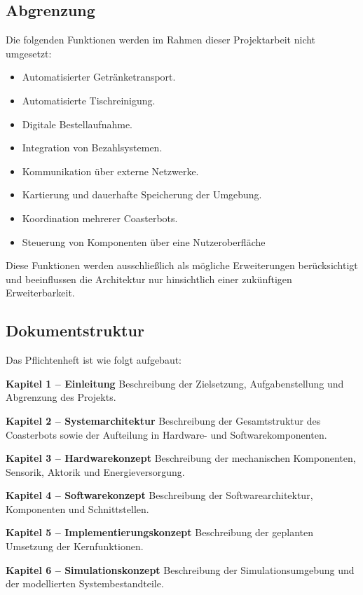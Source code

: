 \documentclass[
  a4paper,
  12pt,
  DIV=12,        %
  parskip=half,  %
  headings=small %
]{scrartcl}
\theoremstyle{definition}
\providecommand{\tightlist}{%
  \setlength{\itemsep}{0pt}\setlength{\parskip}{0pt}}
\theoremstyle{definition}
\begin{document}
\subsection{Abgrenzung}\label{abgrenzung}

Die folgenden Funktionen werden im Rahmen dieser Projektarbeit nicht
umgesetzt:

\begin{itemize}
\tightlist
\item
  Automatisierter Getränketransport.
\item
  Automatisierte Tischreinigung.
\item
  Digitale Bestellaufnahme.
\item
  Integration von Bezahlsystemen.
\item
  Kommunikation über externe Netzwerke.
\item
  Kartierung und dauerhafte Speicherung der Umgebung.
\item
  Koordination mehrerer Coasterbots.
\item
  Steuerung von Komponenten über eine Nutzeroberfläche
\end{itemize}

Diese Funktionen werden ausschließlich als mögliche Erweiterungen
berücksichtigt und beeinflussen die Architektur nur hinsichtlich einer
zukünftigen Erweiterbarkeit.

\subsection{Dokumentstruktur}\label{dokumentstruktur}

Das Pflichtenheft ist wie folgt aufgebaut:

\textbf{Kapitel 1 -- Einleitung} Beschreibung der Zielsetzung,
Aufgabenstellung und Abgrenzung des Projekts.

\textbf{Kapitel 2 -- Systemarchitektur} Beschreibung der Gesamtstruktur
des Coasterbots sowie der Aufteilung in Hardware- und
Softwarekomponenten.

\textbf{Kapitel 3 -- Hardwarekonzept} Beschreibung der mechanischen
Komponenten, Sensorik, Aktorik und Energieversorgung.

\textbf{Kapitel 4 -- Softwarekonzept} Beschreibung der
Softwarearchitektur, Komponenten und Schnittstellen.

\textbf{Kapitel 5 -- Implementierungskonzept} Beschreibung der geplanten
Umsetzung der Kernfunktionen.

\textbf{Kapitel 6 -- Simulationskonzept} Beschreibung der
Simulationsumgebung und der modellierten Systembestandteile.
\end{document}
